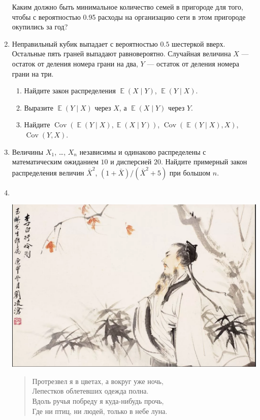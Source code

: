 \documentclass[12pt]{article} %
\DeclareMathOperator{\Cov}{Cov}
\DeclareMathOperator{\E}{\mathbb{E}}
\begin{document}
\begin{enumerate}
  Каким должно быть минимальное количество семей в пригороде для того, чтобы с вероятностью 0.95
  расходы на организацию сети в этом пригороде окупились за год?
  
  
  \item  Неправильный кубик выпадает с вероятностью $0.5$ шестеркой вверх. 
  Остальные пять граней выпадают равновероятно. 
  Случайная величина $X$ — остаток от деления номера грани на два, 
  $Y$ — остаток от деления номера грани на три. 
 \begin{enumerate}
 \item Найдите закон распределения $\E(X\mid Y)$, $\E(Y\mid X)$.
 \item Выразите $\E(Y\mid X)$ через $X$, а $\E(X\mid Y)$ через $Y$.
 \item Найдите $\Cov(\E(Y\mid X),\E(X\mid Y))$, $\Cov(\E(Y\mid X),X)$, $\Cov(Y,X)$.
 \end{enumerate}
 
    
  \item  Величины $X_1$, \ldots, $X_n$ независимы и одинаково распределены с математическим ожиданием $10$ и дисперсией $20$. 
  Найдите примерный закон распределения величин $\bar X^2$, $(1+\bar{X})/(\bar{X}^2+5)$ при большом $n$.
 \newpage
 \item $ $ \\ %
 \vspace{\baselineskip}
 \begin{minipage}{\linewidth}
 \includegraphics[width=17cm]{libo.png}
 \end{minipage}

 \begin{minipage}{12cm}
 \begin{quote}
    Протрезвел я в цветах, а вокруг уже ночь, \\
    Лепестков облетевших одежда полна. \\
    Вдоль ручья побреду я куда-нибудь прочь, \\
    Где ни птиц, ни людей, только в небе луна. 
    

\end{quote}
\end{minipage}
\end{enumerate}
\end{document}

